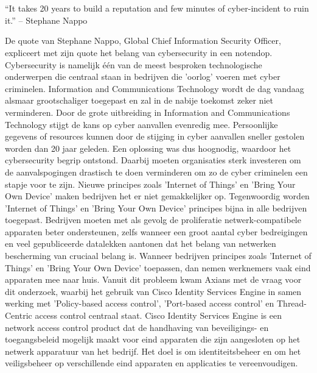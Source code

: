 
\chapter{}
\label{ch:inleiding}

\begin{displayquote}
	“It takes 20 years to build a reputation and few minutes of cyber-incident to ruin it.” – Stephane Nappo
\end{displayquote}

De quote van Stephane Nappo, Global Chief Information Security Officer, expliceert met zijn quote het belang van cybersecurity in een notendop. Cybersecurity is namelijk één van de meest besproken technologische onderwerpen die centraal staan in bedrijven die 'oorlog' voeren met cyber criminelen. Information and Communications Technology wordt de dag vandaag alsmaar grootschaliger toegepast en zal in de nabije toekomst zeker niet verminderen. Door de grote uitbreiding in Information and Communications Technology stijgt de kans op cyber aanvallen evenredig mee. Persoonlijke gegevens of resources kunnen door de stijging in cyber aanvallen sneller gestolen worden dan 20 jaar geleden. Een oplossing was dus hoognodig, waardoor het cybersecurity begrip ontstond. 
\newline
\newline
Daarbij moeten organisaties sterk investeren om de aanvalspogingen drastisch te doen verminderen om zo de cyber criminelen een stapje voor te zijn. Nieuwe principes zoals 'Internet of Things' en 'Bring Your Own Device' maken bedrijven het er niet gemakkelijker op. Tegenwoordig worden 'Internet of Things' en 'Bring Your Own Device' principes bijna in alle bedrijven toegepast. Bedrijven moeten met als gevolg de proliferatie netwerk-compatibele apparaten beter ondersteunen, zelfs wanneer een groot aantal cyber bedreigingen en veel gepubliceerde datalekken aantonen dat het belang van netwerken bescherming van cruciaal belang is. 
\newline
\newline
Wanneer bedrijven principes zoals 'Internet of Things' en 'Bring Your Own Device' toepassen, dan nemen werknemers vaak eind apparaten mee naar huis. 
Vanuit dit probleem kwam Axians met de vraag voor dit onderzoek, waarbij het gebruik van Cisco Identity Services Engine in samen werking met 'Policy-based access control', 'Port-based access control' en Thread-Centric access control centraal staat. Cisco Identity Services Engine is een network access control product dat de handhaving van beveiligings- en toegangsbeleid mogelijk maakt voor eind apparaten die zijn aangesloten op het netwerk apparatuur van het bedrijf. Het doel is om identiteitsbeheer en om het veiligsbeheer op verschillende eind apparaten en applicaties te vereenvoudigen.
